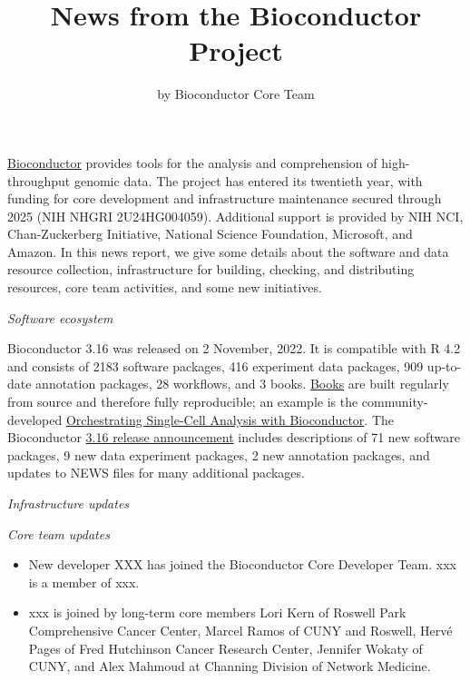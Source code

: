 
\title{News from the Bioconductor Project}
\author{by Bioconductor Core Team}
\maketitle

\href{https://bioconductor.org}{Bioconductor} provides
tools for the analysis and comprehension of high-throughput genomic
data.  The project has entered its twentieth year, with funding
for core development and infrastructure maintenance secured
through 2025 (NIH NHGRI 2U24HG004059).  Additional support is provided
by NIH NCI, Chan-Zuckerberg Initiative, National Science Foundation,
Microsoft, and Amazon.  In this news report, we give some
details about the software and data resource collection,
infrastructure for building, checking, and distributing resources,
core team activities, and some new initiatives.
 
\textit{Software ecosystem}

Bioconductor 3.16 was released on 2 November, 2022. It is
compatible with R 4.2 and consists of 2183 software packages, 416
experiment data packages, 909 up-to-date annotation packages, 28
workflows, and 3 books. \href{https://bioconductor.org/books/release/}{Books} are
built regularly from source and therefore fully
reproducible; an example is the
community-developed \href{https://bioconductor.org/books/release/OSCA/}{Orchestrating
Single-Cell Analysis with Bioconductor}.
The Bioconductor
\href{https://bioconductor.org/news/bioc_3_16_release/}{3.16 release
  announcement} includes descriptions of 71 new software packages, 9 new data
  experiment packages, 2 new annotation packages, and updates to NEWS files for
  many additional packages. 

\textit{Infrastructure updates}

\begin{itemize}
\end{itemize}

\textit{Core team updates}
\begin{itemize}
\item New developer XXX has joined the Bioconductor Core Developer Team.  xxx is a member of xxx.
\item xxx is joined by long-term core members Lori Kern of Roswell Park
Comprehensive Cancer Center, Marcel Ramos of CUNY and Roswell, Herv\'e Pages of
Fred Hutchinson Cancer Research Center, Jennifer Wokaty of CUNY, and Alex
Mahmoud at Channing Division of Network Medicine.
\end{itemize}

